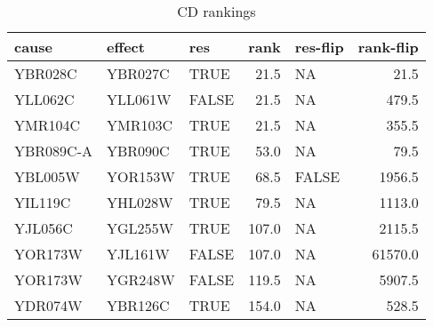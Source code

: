 \begin{table}

\caption{CD rankings  \label{tab:CD-ranks}}
\centering
\begin{tabular}[t]{lllrlr}
\toprule
cause & effect & res & rank & res-flip & rank-flip\\
\midrule
YBR028C & YBR027C & TRUE & 21.5 & NA & 21.5\\
YLL062C & YLL061W & FALSE & 21.5 & NA & 479.5\\
YMR104C & YMR103C & TRUE & 21.5 & NA & 355.5\\
YBR089C-A & YBR090C & TRUE & 53.0 & NA & 79.5\\
YBL005W & YOR153W & TRUE & 68.5 & FALSE & 1956.5\\
\addlinespace
YIL119C & YHL028W & TRUE & 79.5 & NA & 1113.0\\
YJL056C & YGL255W & TRUE & 107.0 & NA & 2115.5\\
YOR173W & YJL161W & FALSE & 107.0 & NA & 61570.0\\
YOR173W & YGR248W & FALSE & 119.5 & NA & 5907.5\\
YDR074W & YBR126C & TRUE & 154.0 & NA & 528.5\\
\bottomrule
\end{tabular}
\end{table}
